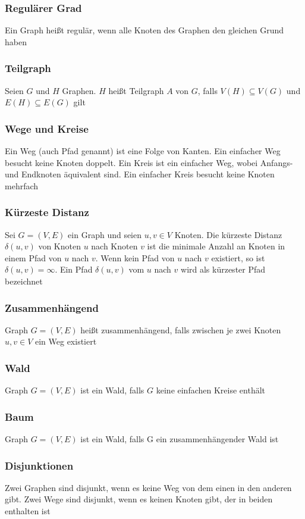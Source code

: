\documentclass[a4paper]{article}
\begin{document}
	\subsubsection{Regulärer Grad}
		Ein Graph heißt regulär, wenn alle Knoten des Graphen den gleichen Grund haben
	\subsubsection{Teilgraph}
		Seien $G$ und $H$ Graphen. $H$ heißt Teilgraph $A$ von $G$, falls $V(H)\subseteq V(G)$ und $E(H)\subseteq E(G)$ gilt
	\subsubsection{Wege und Kreise}
		Ein Weg (auch Pfad genannt) ist eine Folge von Kanten. Ein einfacher Weg besucht keine Knoten doppelt. Ein Kreis ist ein einfacher Weg, wobei Anfangs- und Endknoten äquivalent sind. Ein einfacher Kreis besucht keine Knoten mehrfach
		\newpage
	\subsubsection{Kürzeste Distanz}
		Sei $G=(V,E)$ ein Graph und seien $u,v\in V$ Knoten. Die kürzeste Distanz $\delta(u,v)$ von Knoten $u$ nach Knoten $v$ ist die minimale Anzahl an Knoten in einem Pfad von $u$ nach $v$. Wenn kein Pfad von $u$ nach $v$ existiert, so ist $\delta(u,v)=\infty$. Ein Pfad $\delta(u,v)$ vom $u$ nach $v$ wird als kürzester Pfad bezeichnet
	\subsubsection{Zusammenhängend}
		Graph $G=(V,E)$ heißt zusammenhängend, falls zwischen je zwei Knoten $u,v\in V$ ein Weg existiert
	\subsubsection{Wald}
		Graph $G=(V,E)$ ist ein Wald, falls $G$ keine einfachen Kreise enthält
	\subsubsection{Baum}
		Graph $G=(V,E)$ ist ein Wald, falls G ein zusammenhängender Wald ist
	\subsubsection{Disjunktionen}
		Zwei Graphen sind disjunkt, wenn es keine Weg von dem einen in den anderen gibt. Zwei Wege sind disjunkt, wenn es keinen Knoten gibt, der in beiden enthalten ist
\end{document}
